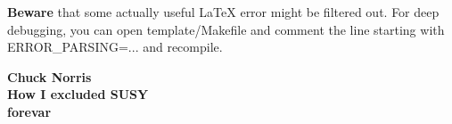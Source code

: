     \textbf{Beware} that some actually useful LaTeX error might be filtered out.
    For deep debugging, you can open template/Makefile and comment the line
    starting with ERROR_PARSING=... and recompile.


\emptypage
\emptypage

\singlespace

\renewcommand{\leftmark}{Bibliography}

\begin{thebibliography}{2}

    

\end{thebibliography}

\newpage
\thispagestyle{empty}



\begin{center}
    \textbf{\Large{Chuck Norris}}\\
    \textbf{\Large{How I excluded SUSY\\forevar\vspace*{0.3cm}}}
\end{center}

